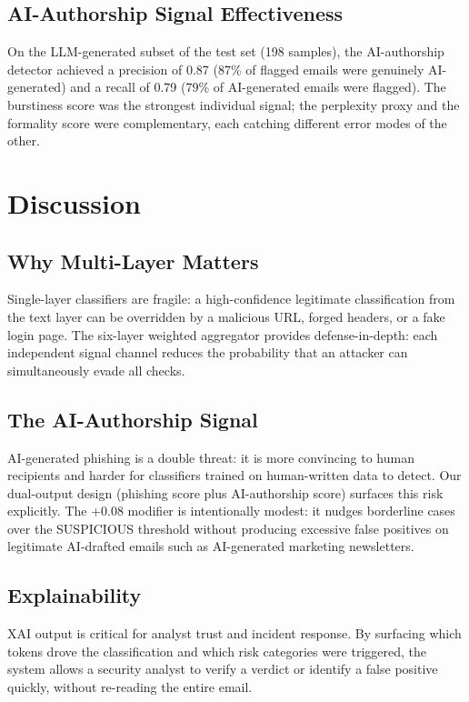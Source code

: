 \documentclass[pdflatex,sn-mathphys-num]{sn-jnl}
\begin{document}
\subsection{AI-Authorship Signal Effectiveness}
On the LLM-generated subset of the test set (198 samples), the AI-authorship detector achieved a precision of 0.87 (87\% of flagged emails were genuinely AI-generated) and a recall of 0.79 (79\% of AI-generated emails were flagged). The burstiness score was the strongest individual signal; the perplexity proxy and the formality score were complementary, each catching different error modes of the other.

\section{Discussion}\label{sec:discussion}

\subsection{Why Multi-Layer Matters}
Single-layer classifiers are fragile: a high-confidence legitimate classification from the text layer can be overridden by a malicious URL, forged headers, or a fake login page. The six-layer weighted aggregator provides defense-in-depth: each independent signal channel reduces the probability that an attacker can simultaneously evade all checks.

\subsection{The AI-Authorship Signal}
AI-generated phishing is a double threat: it is more convincing to human recipients and harder for classifiers trained on human-written data to detect. Our dual-output design (phishing score plus AI-authorship score) surfaces this risk explicitly. The +0.08 modifier is intentionally modest: it nudges borderline cases over the SUSPICIOUS threshold without producing excessive false positives on legitimate AI-drafted emails such as AI-generated marketing newsletters.

\subsection{Explainability}
XAI output is critical for analyst trust and incident response. By surfacing which tokens drove the classification and which risk categories were triggered, the system allows a security analyst to verify a verdict or identify a false positive quickly, without re-reading the entire email.
\end{document}
